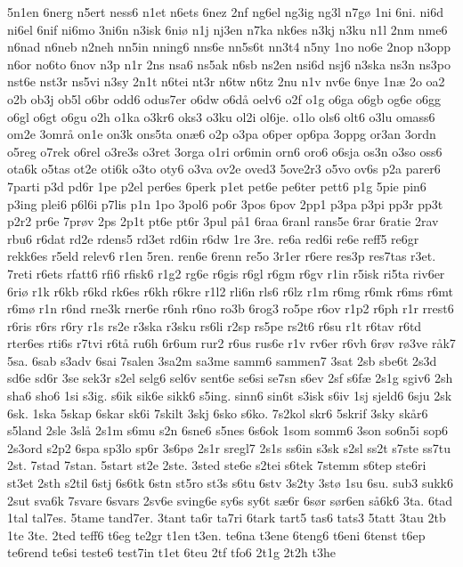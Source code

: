{5n1en
6nerg
n5ert
ness6
n1et
n6ets
6nez
2nf
ng6el
ng3ig
ng3l
n7g^^f8
1ni
6ni.
ni6d
ni6el
6nif
ni6mo
3ni6n
n3isk
6ni^^f8
n1j
nj3en
n7ka
nk6es
n3kj
n3ku
n1l
2nm
nme6
n6nad
n6neb
n2neh
nn5in
nning6
nns6e
nn5s6t
nn3t4
n5ny
1no
no6e
2nop
n3opp
n6or
no6to
6nov
n3p
n1r
2ns
nsa6
ns5ak
n6sb
ns2en
nsi6d
nsj6
n3ska
ns3n
ns3po
nst6e
nst3r
ns5vi
n3sy
2n1t
n6tei
nt3r
n6tw
n6tz
2nu
n1v
nv6e
6nye
1n^^e6
2o
oa2
o2b
ob3j
ob5l
o6br
odd6
odus7er
o6dw
o6d^^e5
oelv6
o2f
o1g
o6ga
o6gb
og6e
o6gg
o6gl
o6gt
o6gu
o2h
o1ka
o3kr6
oks3
o3ku
ol2i
ol6je.
o1lo
ols6
olt6
o3lu
omass6
om2e
3omr^^e5
on1e
on3k
ons5ta
on^^e66
o2p
o3pa
o6per
op6pa
3oppg
or3an
3ordn
o5reg
o7rek
o6rel
o3re3s
o3ret
3orga
o1ri
or6min
orn6
oro6
o6sja
os3n
o3so
oss6
ota6k
o5tas
ot2e
oti6k
o3to
oty6
o3va
ov2e
oved3
5ove2r3
o5vo
ov6s
p2a
parer6
7parti
p3d
pd6r
1pe
p2el
per6es
6perk
p1et
pet6e
pe6ter
pett6
p1g
5pie
pin6
p3ing
plei6
p6l6i
p7lis
p1n
1po
3pol6
po6r
3pos
6pov
2pp1
p3pa
p3pi
pp3r
pp3t
p2r2
pr6e
7pr^^f8v
2ps
2p1t
pt6e
pt6r
3pul
p^^e51
6raa
6ranl
rans5e
6rar
6ratie
2rav
rbu6
r6dat
rd2e
rdens5
rd3et
rd6in
r6dw
1re
3re.
re6a
red6i
re6e
reff5
re6gr
rekk6es
r5eld
relev6
r1en
5ren.
ren6e
6renn
re5o
3r1er
r6ere
res3p
res7tas
r3et.
7reti
r6ets
rfatt6
rfi6
rfisk6
r1g2
rg6e
r6gis
r6gl
r6gm
r6gv
r1in
r5isk
ri5ta
riv6er
6ri^^f8
r1k
r6kb
r6kd
rk6es
r6kh
r6kre
r1l2
rli6n
rls6
r6lz
r1m
r6mg
r6mk
r6ms
r6mt
r6m^^f8
r1n
r6nd
rne3k
rner6e
r6nh
r6no
ro3b
6rog3
ro5pe
r6ov
r1p2
r6ph
r1r
rrest6
r6ris
r6rs
r6ry
r1s
rs2e
r3ska
r3sku
rs6li
r2sp
rs5pe
rs2t6
r6su
r1t
r6tav
r6td
rter6es
rti6s
r7tvi
r6t^^e5
ru6h
6r6um
rur2
r6us
rus6e
r1v
rv6er
r6vh
6r^^f8v
r^^f83ve
r^^e5k7
5sa.
6sab
s3adv
6sai
7salen
3sa2m
sa3me
samm6
sammen7
3sat
2sb
sbe6t
2s3d
sd6e
sd6r
3se
sek3r
s2el
selg6
sel6v
sent6e
se6si
se7sn
s6ev
2sf
s6f^^e6
2s1g
sgiv6
2sh
sha6
sho6
1si
s3ig.
s6ik
sik6e
sikk6
s5ing.
sinn6
sin6t
s3isk
s6iv
1sj
sjeld6
6sju
2sk
6sk.
1ska
5skap
6skar
sk6i
7skilt
3skj
6sko
s6ko.
7s2kol
skr6
5skrif
3sky
sk^^e5r6
s5land
2sle
3sl^^e5
2s1m
s6mu
s2n
6sne6
s5nes
6s6ok
1som
somm6
3son
so6n5i
sop6
2s3ord
s2p2
6spa
sp3lo
sp6r
3s6p^^f8
2s1r
sregl7
2s1s
ss6in
s3sk
s2sl
ss2t
s7ste
ss7tu
2st.
7stad
7stan.
5start
st2e
2ste.
3sted
ste6e
s2tei
s6tek
7stemm
s6tep
ste6ri
st3et
2sth
s2til
6stj
6s6tk
6stn
st5ro
st3s
s6tu
6stv
3s2ty
3st^^f8
1su
6su.
sub3
sukk6
2sut
sva6k
7svare
6svars
2sv6e
sving6e
sy6s
sy6t
s^^e66r
6s^^f8r
s^^f8r6en
s^^e56k6
3ta.
6tad
1tal
tal7es.
5tame
tand7er.
3tant
ta6r
ta7ri
6tark
tart5
tas6
tats3
5tatt
3tau
2tb
1te
3te.
2ted
teff6
t6eg
te2gr
t1en
t3en.
te6na
t3ene
6teng6
t6eni
6tenst
t6ep
te6rend
te6si
teste6
test7in
t1et
6teu
2tf
tfo6
2t1g
2t2h
t3he
}
